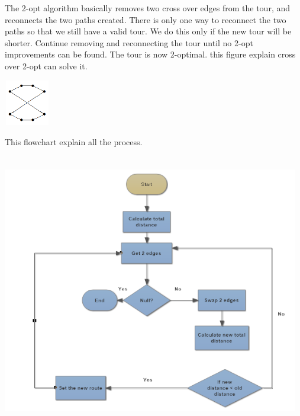 \documentclass[12pt]{article}
\newcounter{subsubsubsection}[subsubsection]
\begin{document}
The 2-opt algorithm basically removes two cross over edges
from the tour, and reconnects the two paths created.
There is only one way to reconnect the two paths so that we still
have a valid tour. We do this only if the
new tour will be shorter. Continue removing and reconnecting
the tour until no 2-opt improvements can
be found. The tour is now 2-optimal. this figure explain cross over 2-opt can solve it.
\begin{center}
	\includegraphics[width=2cm,height=2cm]{./assets/example/graph-2opt-1.png}
\end{center}
This flowchart explain all the process.
\begin{center}
	\includegraphics[width=13cm,height=12cm]{./assets/flowchart/2-opt.png}\\
\end{center}
\end{document}
